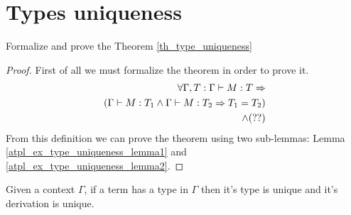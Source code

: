 \documentclass[12pt,a4paper,oneside]{book}
\begin{document}
\section{Types uniqueness}

\begin{exercise}
    Formalize and prove the Theorem \ref{th_type_uniqueness}

    \begin{proof}
        First of all we must formalize the theorem in order to prove it.
        \begin{align*}
            \forall \Gamma, T \mathrel{:} \Gamma \vdash M : T \Rightarrow \\
            (\Gamma \vdash M : T_1 \land \Gamma \vdash M : T_2 \Rightarrow T_1 = T_2) \\
            \land (??)
        \end{align*}
        From this definition we can prove the theorem using two
        sub-lemmas: Lemma \ref{atpl_ex_type_uniqueness_lemma1} and
        \ref{atpl_ex_type_uniqueness_lemma2}.
    \end{proof}
\end{exercise}

\begin{theorem}
    \label{th_type_uniqueness}
    Given a context $\Gamma$, if a term has a type in $\Gamma$ then
    it's type is unique and it's derivation is unique.
\end{theorem}
\end{document}
